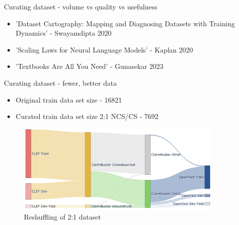 \documentclass[aspectratio=149]{beamer}
\begin{document}
\begin{frame}{Curating dataset - volume vs quality vs usefulness}
\begin{itemize}

  

  \item 'Dataset Cartography: Mapping and Diagnosing Datasets with Training Dynamics' - Swayamdipta 2020
    \item 'Scaling Laws for Neural Language Models' - Kaplan 2020
    \item 'Textbooks Are All You Need' - Gunasekar 2023
\end{itemize}

\end{frame}

\begin{frame}{Curating dataset - fewer, better data}
\begin{itemize}
  \item Original train data set size - 16821
  \item Curated train data set size 2:1 NCS/CS - 7692

\end{itemize}

\begin{figure}[h]
    \centering
    \includegraphics[width=10cm]{./sank}
\caption{Reshuffling of 2:1 dataset}
\end{figure}
\end{frame}
\end{document}
